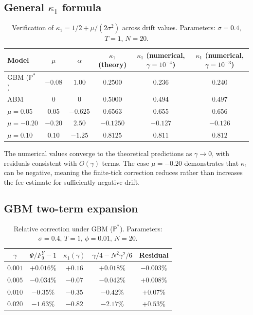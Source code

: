 \documentclass[11pt]{article}
\theoremstyle{definition}
\theoremstyle{remark}
\newcommand{\PP}{\mathbb{P}}
\begin{document}
\subsection{General $\kappa_1$ formula}

\begin{table}[h]
\centering
\caption{Verification of $\kappa_1 = 1/2 + \mu/(2\sigma^2)$ across
drift values. Parameters: $\sigma = 0.4$, $T = 1$, $N = 20$.}
\label{tab:general_kappa1}
\begin{tabular}{lccccc}
\toprule
Model & $\mu$ & $\alpha$ & $\kappa_1$ (theory)
& $\kappa_1$ (numerical, $\gamma = 10^{-4}$)
& $\kappa_1$ (numerical, $\gamma = 10^{-3}$) \\
\midrule
GBM ($\PP^*$) & $-0.08$ & $1.00$ & $0.2500$
& $0.236$ & $0.240$ \\
ABM & $0$ & $0$ & $0.5000$
& $0.494$ & $0.497$ \\
$\mu = 0.05$ & $0.05$ & $-0.625$ & $0.6563$
& $0.655$ & $0.656$ \\
$\mu = -0.20$ & $-0.20$ & $2.50$ & $-0.1250$
& $-0.127$ & $-0.126$ \\
$\mu = 0.10$ & $0.10$ & $-1.25$ & $0.8125$
& $0.811$ & $0.812$ \\
\bottomrule
\end{tabular}
\end{table}

The numerical values converge to the theoretical predictions as
$\gamma \to 0$, with residuals consistent with $O(\gamma)$ terms.
The case $\mu = -0.20$ demonstrates that $\kappa_1$ can be negative,
meaning the finite-tick correction reduces rather than increases the
fee estimate for sufficiently negative drift.

\subsection{GBM two-term expansion}

\begin{table}[h]
\centering
\caption{Relative correction under GBM ($\PP^*$).
Parameters: $\sigma = 0.4$, $T = 1$, $\phi = 0.01$, $N = 20$.}
\label{tab:main}
\begin{tabular}{ccccc}
\toprule
$\gamma$ & $\Psi/F_0^Y - 1$ & $\kappa_1(\gamma)$
& $\gamma/4 - N^2\gamma^2/6$ & Residual \\
\midrule
$0.001$ & $+0.016\%$ & $+0.16$ & $+0.018\%$ & $-0.003\%$ \\
$0.005$ & $-0.034\%$ & $-0.07$ & $-0.042\%$ & $+0.008\%$ \\
$0.010$ & $-0.35\%$ & $-0.35$ & $-0.42\%$ & $+0.07\%$ \\
$0.020$ & $-1.63\%$ & $-0.82$ & $-2.17\%$ & $+0.53\%$ \\
\bottomrule
\end{tabular}
\end{table}
\end{document}

